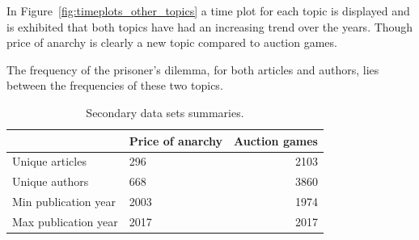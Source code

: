 \documentclass{article}
\theoremstyle{definition}
\begin{document}
In Figure~\ref{fig:timeplots_other_topics} a time plot for each topic is
displayed and is exhibited that both topics have had an increasing trend over
the years. Though price of anarchy is clearly a new topic compared to auction games.

The frequency of the prisoner's dilemma, for both articles and authors, lies
between the frequencies of these two topics.

\begin{table}[!hbtp]
    \begin{center}
    \begin{tabular}{llr}
        \toprule
         &            Price of anarchy &  Auction games \\
        \midrule
        Unique articles      & 296  & 2103 \\
        Unique authors       & 668  & 3860 \\
        Min publication year & 2003 & 1974 \\
        Max publication year & 2017 & 2017 \\
        \bottomrule
    \end{tabular}
    \end{center}
    \caption{Secondary data sets summaries.}
    \label{table:summary_other_topics}
\end{table}
\end{document}
